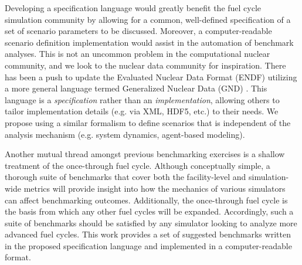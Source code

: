 \documentclass{anstrans}
\begin{document}
Developing a specification language would greatly benefit the fuel cycle
simulation community by allowing for a common, well-defined specification of a
set of scenario parameters to be discussed. Moreover, a computer-readable
scenario definition implementation would assist in the automation of benchmark
analyses. This is not an uncommon problem in the computational nuclear
community, and we look to the nuclear data community for inspiration. There has
been a push to update the Evaluated Nuclear Data Format (ENDF) utilizing a more
general language termed Generalized Nuclear Data (GND)
\cite{mattoon_generalized_2012}. This language is a \emph{specification} rather
than an \emph{implementation}, allowing others to tailor implementation details
(e.g. via XML, HDF5, etc.) to their needs. We propose using a similar formalism
to define scenarios that is independent of the analysis mechanism (e.g. system
dynamics, agent-based modeling).

Another mutual thread amongst previous benchmarking exercises is a shallow
treatment of the once-through fuel cycle. Although conceptually simple, a
thorough suite of benchmarks that cover both the facility-level and
simulation-wide metrics will provide insight into how the mechanics of various
simulators can affect benchmarking outcomes. Additionally, the once-through fuel
cycle is the basis from which any other fuel cycles will be expanded.
Accordingly, such a suite of benchmarks should be satisfied by any simulator
looking to analyze more advanced fuel cycles. This work provides a set of
suggested benchmarks written in the proposed specification language and
implemented in a computer-readable format.

\end{document}
